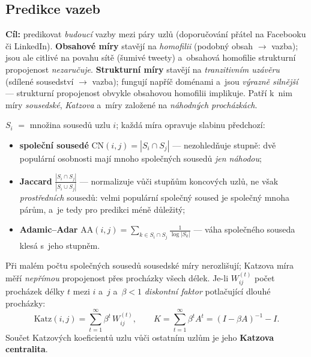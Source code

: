 \documentclass[11pt,a4paper]{article}
\theoremstyle{definition}
\begin{document}
\subsection{Predikce vazeb}

\begin{defbox}
\textbf{Cíl:} predikovat \emph{budoucí} vazby mezi páry uzlů (doporučování přátel na
Facebooku či LinkedIn). \textbf{Obsahové míry} stavějí na \emph{homofilii} (podobný obsah
$\to$ vazba); jsou ale citlivé na povahu sítě (šumivé tweety) a~obsahová homofilie strukturní
propojenost \emph{nezaručuje}. \textbf{Strukturní míry} stavějí na \emph{tranzitivním
uzávěru} (sdílené sousedství $\to$ vazba); fungují napříč doménami a~jsou \emph{výrazně
silnější} --- strukturní propojenost obvykle obsahovou homofilii implikuje. Patří k~nim míry
\emph{sousedské}, \emph{Katzova} a~míry založené na \emph{náhodných procházkách}.
\end{defbox}

\begin{defbox}
$S_i$ $=$ množina sousedů uzlu $i$; každá míra opravuje slabinu předchozí:
\begin{itemize}
\item \textbf{společní sousedé} $\mathrm{CN}(i,j)=|S_i\cap S_j|$ --- nezohledňuje stupně:
      dvě populární osobnosti mají mnoho společných sousedů \emph{jen náhodou};
\item \textbf{Jaccard} $\frac{|S_i\cap S_j|}{|S_i\cup S_j|}$ --- normalizuje vůči stupňům
      koncových uzlů, ne však \emph{prostředních} sousedů: velmi populární společný soused
      je společný mnoha párům, a~je tedy pro predikci méně důležitý;
\item \textbf{Adamic--Adar} $\mathrm{AA}(i,j)=\sum_{k\in S_i\cap S_j}\frac{1}{\log|S_k|}$
      --- váha společného souseda klesá s~jeho stupněm.
\end{itemize}
\end{defbox}

\begin{defbox}
Při malém počtu společných sousedů sousedské míry nerozlišují; Katzova míra měří
\emph{nepřímou} propojenost přes procházky všech délek. Je-li $W_{ij}^{(t)}$ počet procházek
délky $t$ mezi $i$ a~$j$ a~$\beta<1$ \emph{diskontní faktor} potlačující dlouhé procházky:
\[ \mathrm{Katz}(i,j)=\sum_{t=1}^{\infty}\beta^{t}\,W_{ij}^{(t)},\qquad
   K=\sum_{t=1}^{\infty}\beta^{t}A^{t}=(I-\beta A)^{-1}-I. \]
Součet Katzových koeficientů uzlu vůči ostatním uzlům je jeho \textbf{Katzova centralita}.
\end{defbox}
\end{document}
